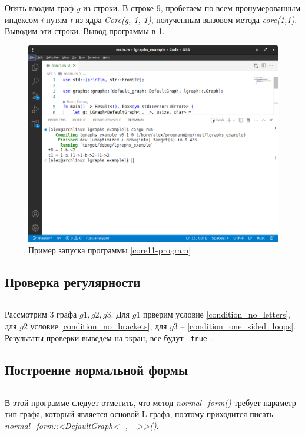 Опять вводим граф \emph{g} из строки. В строке 9, пробегаем по всем пронумерованным индексом \emph{i} путям \emph{t} 
из ядра \emph{Core(g, 1, 1)}, полученным вызовом метода \emph{core(1,1)}. 
Выводим эти строки. Вывод программы в \ref{core11-out-image}.

\begin{figure}
    \centering
    \includegraphics[scale=0.4]{static_images/core11.png}
    \caption{Пример запуска программы \ref{core11-program}}
    \label{core11-out-image}
\end{figure}

\subsection{Проверка регулярности}
\inputminted[linenos]{rust}{../lgraphs/examples/reg.rs} \label{reg-program}

Рассмотрим 3 графа $g1,g2,g3$. Для $g1$ прверим условие \ref{condition_no_letters}, 
для $g2$ условие \ref{condition_no_brackets}, для $g3$ -- \ref{condition_one_sided_loops}.
Результаты проверки выведем на экран, все будут \verb | true |.

\subsection{Построение нормальной формы}
\inputminted[linenos]{rust}{../lgraphs/examples/normal.rs} \label{normal-program}

В этой программе следует отметить, что метод \emph{normal\_form()} требует параметр-тип графа, который является основой
L-графа, поэтому приходится писать \emph{normal\_form::<DefaultGraph<\_, \_>{}>()}.

